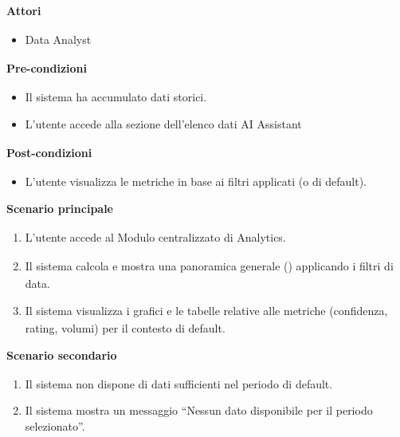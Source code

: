 ﻿\documentclass[a4paper,11pt]{article}
\begin{document}
\textbf{Attori\textsubscript{}}
\begin{itemize}
    \item Data Analyst\textsubscript{}
\end{itemize}

\textbf{Pre-condizioni\textsubscript{}}
\begin{itemize}
    \item Il sistema ha accumulato dati storici.
    \item L'utente accede alla sezione dell'elenco dati AI Assistant\textsubscript{}
\end{itemize}

\textbf{Post-condizioni\textsubscript{}}
\begin{itemize}
    \item L'utente visualizza le metriche in base ai filtri applicati (o di default).
\end{itemize}

\textbf{Scenario principale\textsubscript{}}
\begin{enumerate}
    \item L'utente accede al Modulo\textsubscript{} centralizzato di Analytics.
    \item Il sistema calcola e mostra una panoramica generale (\textsubscript{}) applicando i filtri di data.
    \item Il sistema visualizza i grafici e le tabelle relative alle metriche (confidenza\textsubscript{}, rating, volumi) per il contesto di default.
\end{enumerate}

\textbf{Scenario secondario\textsubscript{}}
\begin{enumerate}
    \item Il sistema non dispone di dati sufficienti nel periodo di default.
    \item Il sistema mostra un messaggio ``Nessun dato disponibile per il periodo selezionato''.
\end{enumerate}
\end{document}
